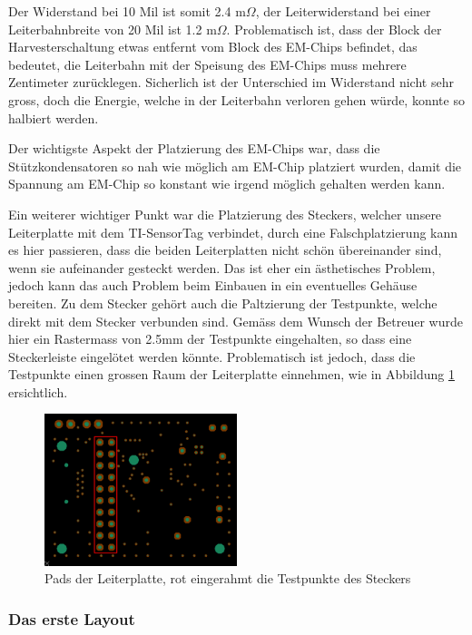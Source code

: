 
Der Widerstand bei 10 Mil ist somit 2.4 m$\Omega$, 
der Leiterwiderstand bei einer Leiterbahnbreite von 20 Mil ist 1.2 m$\Omega$. 
Problematisch ist, dass der Block der Harvesterschaltung etwas entfernt vom Block des EM-Chips befindet, das bedeutet, die Leiterbahn mit der Speisung des EM-Chips muss mehrere Zentimeter zurücklegen. Sicherlich ist der Unterschied im Widerstand nicht sehr gross, doch die Energie, welche in der Leiterbahn verloren gehen würde, konnte so halbiert werden.

Der wichtigste Aspekt der Platzierung des EM-Chips war, dass die Stützkondensatoren so nah wie möglich am EM-Chip platziert wurden, damit die Spannung am EM-Chip so konstant wie irgend möglich gehalten werden kann.

Ein weiterer wichtiger Punkt war die Platzierung des Steckers, welcher unsere Leiterplatte mit dem TI-SensorTag verbindet, durch eine Falschplatzierung kann es hier passieren, dass die beiden Leiterplatten nicht schön übereinander sind, wenn sie aufeinander gesteckt werden. Das ist eher ein ästhetisches Problem, jedoch kann das auch Problem beim Einbauen in ein eventuelles Gehäuse bereiten. Zu dem Stecker gehört auch die Paltzierung der Testpunkte, welche direkt mit dem Stecker verbunden sind. Gemäss dem Wunsch der Betreuer wurde hier ein Rastermass von 2.5mm der Testpunkte eingehalten, so dass eine Steckerleiste eingelötet werden könnte. Problematisch ist jedoch, dass die Testpunkte einen grossen Raum der Leiterplatte einnehmen, wie in Abbildung \ref{layout_testpunkteraster} ersichtlich.

\begin{figure}[ht]
    \includegraphics[width=0.5\textwidth]{3Vorgehen/imag/Layout_Testpunkteraster.png}
    \caption{Pads der Leiterplatte, rot eingerahmt die Testpunkte des Steckers}\label{layout_testpunkteraster} 
\end{figure}

\subsubsection{Das erste Layout}

